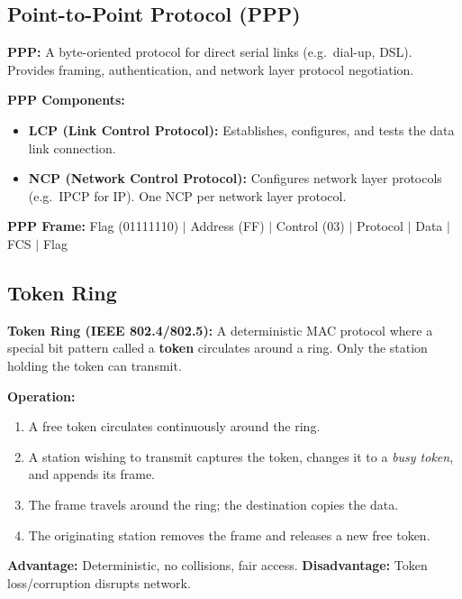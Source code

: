 \documentclass[12pt,a4paper]{article}
\begin{document}
\subsection{Point-to-Point Protocol (PPP)}

\begin{tcolorbox}[defbox]
\textbf{PPP:} A byte-oriented protocol for direct serial links (e.g.\ dial-up, DSL). Provides framing, authentication, and network layer protocol negotiation.
\end{tcolorbox}

\textbf{PPP Components:}
\begin{itemize}[leftmargin=*, itemsep=3pt]
  \item \textbf{LCP (Link Control Protocol):} Establishes, configures, and tests the data link connection.
  \item \textbf{NCP (Network Control Protocol):} Configures network layer protocols (e.g.\ IPCP for IP). One NCP per network layer protocol.
\end{itemize}

\textbf{PPP Frame:} Flag (01111110) $|$ Address (FF) $|$ Control (03) $|$ Protocol $|$ Data $|$ FCS $|$ Flag

\subsection{Token Ring}

\begin{tcolorbox}[defbox]
\textbf{Token Ring (IEEE 802.4/802.5):} A deterministic MAC protocol where a special bit pattern called a \textbf{token} circulates around a ring. Only the station holding the token can transmit.
\end{tcolorbox}

\textbf{Operation:}
\begin{enumerate}[label=\textbf{\arabic*.}, leftmargin=*, itemsep=3pt]
  \item A free token circulates continuously around the ring.
  \item A station wishing to transmit captures the token, changes it to a \textit{busy token}, and appends its frame.
  \item The frame travels around the ring; the destination copies the data.
  \item The originating station removes the frame and releases a new free token.
\end{enumerate}
\textbf{Advantage:} Deterministic, no collisions, fair access. \textbf{Disadvantage:} Token loss/corruption disrupts network.
\end{document}
